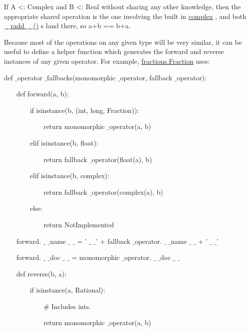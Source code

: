\documentclass[a4paper,12pt]{report}
\begin{document}
 \par
\noindent 
If A <: Complex and B <: Real without sharing any other knowledge, then the appropriate shared operation is the one involving the built in \href{https://docs.python.org/2/library/functions.html}{complex}
, and both \href{https://docs.python.org/2/reference/datamodel.html}{ $  \_  $ $  \_  $radd $  \_  $ $  \_  $()}
 s land there, so a+b == b+a. \par
\noindent 
Because most of the operations on any given type will be very similar, it can be useful to define a helper function which generates the forward and reverse instances of any given operator. For example, \href{https://docs.python.org/2/library/fractions.html}{fractions.Fraction}
 uses: \par
\noindent 
def  $  \_  $operator $  \_  $fallbacks(monomorphic $  \_  $operator, fallback $  \_  $operator): \par
\noindent 
~~~ def forward(a, b): \par
\noindent 
~~~~~~~ if isinstance(b, (int, long, Fraction)): \par
\noindent 
~~~~~~~~~~~ return monomorphic $  \_  $operator(a, b) \par
\noindent 
~~~~~~~ elif isinstance(b, float): \par
\noindent 
~~~~~~~~~~~ return fallback $  \_  $operator(float(a), b) \par
\noindent 
~~~~~~~ elif isinstance(b, complex): \par
\noindent 
~~~~~~~~~~~ return fallback $  \_  $operator(complex(a), b) \par
\noindent 
~~~~~~~ else: \par
\noindent 
~~~~~~~~~~~ return NotImplemented \par
\noindent 
~~~ forward. $  \_  $ $  \_  $name $  \_  $ $  \_  $ = ' $  \_  $ $  \_  $' + fallback $  \_  $operator. $  \_  $ $  \_  $name $  \_  $ $  \_  $ + ' $  \_  $ $  \_  $' \par
\noindent 
~~~ forward. $  \_  $ $  \_  $doc $  \_  $ $  \_  $ = monomorphic $  \_  $operator. $  \_  $ $  \_  $doc $  \_  $ $  \_  $ \par
\noindent 
\vspace{12pt}
\noindent 
~~~ def reverse(b, a): \par
\noindent 
~~~~~~~ if isinstance(a, Rational): \par
\noindent 
~~~~~~~~~~~  $  \#  $ Includes ints. \par
\noindent 
~~~~~~~~~~~ return monomorphic $  \_  $operator(a, b) \par
\end{document}
